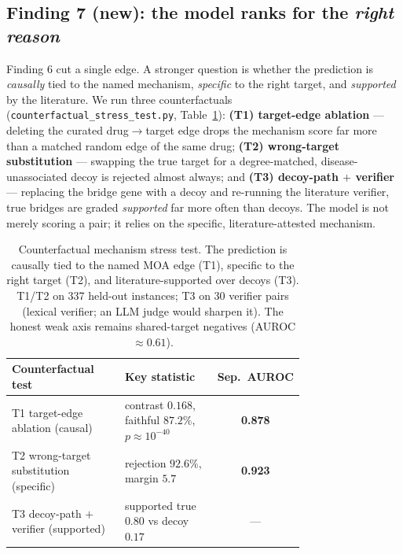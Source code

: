 \documentclass[11pt]{article}
\begin{document}
\subsection{Finding 7 (new): the model ranks for the \emph{right reason}}
Finding 6 cut a single edge. A stronger question is whether the prediction is
\emph{causally} tied to the named mechanism, \emph{specific} to the right target, and
\emph{supported} by the literature. We run three counterfactuals
(\texttt{counterfactual\_stress\_test.py}, Table~\ref{tab:counterfactual}):
\textbf{(T1) target-edge ablation} --- deleting the curated drug$\to$target edge drops the
mechanism score far more than a matched random edge of the same drug;
\textbf{(T2) wrong-target substitution} --- swapping the true target for a degree-matched,
disease-unassociated decoy is rejected almost always; and \textbf{(T3) decoy-path $+$
verifier} --- replacing the bridge gene with a decoy and re-running the literature verifier,
true bridges are graded \emph{supported} far more often than decoys. The model is not merely
scoring a pair; it relies on the specific, literature-attested mechanism.

\begin{table}[H]
\centering\small
\begin{tabular}{>{\raggedright\arraybackslash}p{0.40\linewidth} >{\raggedright\arraybackslash}p{0.34\linewidth} c}
\toprule
\rowcolor{sriblue}\color{white}\textbf{Counterfactual test} & \color{white}\textbf{Key statistic} & \color{white}\textbf{Sep.\ AUROC}\\
\midrule
\rowcolor{srirow} T1 target-edge ablation (causal) & contrast $0.168$, faithful $87.2\%$, $p\!\approx\!10^{-40}$ & \textbf{0.878}\\
T2 wrong-target substitution (specific) & rejection $92.6\%$, margin $5.7$ & \textbf{0.923}\\
\rowcolor{srirow} T3 decoy-path $+$ verifier (supported) & supported true $0.80$ vs decoy $0.17$ & ---\\
\bottomrule
\end{tabular}
\caption{Counterfactual mechanism stress test. The prediction is causally tied to the named
MOA edge (T1), specific to the right target (T2), and literature-supported over decoys (T3).
T1/T2 on 337 held-out instances; T3 on 30 verifier pairs (lexical verifier; an LLM judge
would sharpen it). The honest weak axis remains shared-target negatives (AUROC $\approx0.61$).}
\label{tab:counterfactual}
\end{table}
\end{document}
